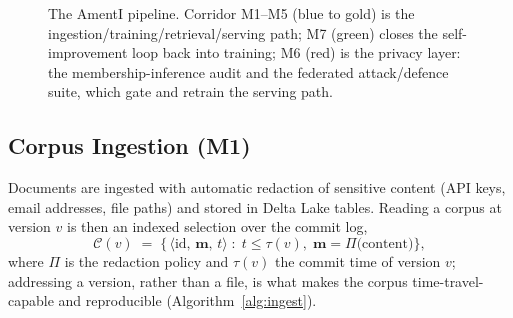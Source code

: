 \documentclass[11pt,a4paper]{article}
\theoremstyle{plain}
\theoremstyle{definition}
\begin{document}
\begin{figure}[h]
\centering
{}
\caption{The AmentI pipeline. Corridor M1--M5 (blue to gold) is the
ingestion/training/retrieval/serving path; M7 (green) closes the
self-improvement loop back into training; M6 (red) is the privacy layer:
the membership-inference audit and the federated attack/defence suite,
which gate and retrain the serving path.}
\label{fig:arch}
\end{figure}


\subsection{Corpus Ingestion (M1)}

Documents are ingested with automatic redaction of sensitive content
(API keys, email addresses, file paths) and stored in Delta Lake tables.
Reading a corpus at version $v$ is then an indexed selection over the
commit log,
\begin{equation}
\mathcal{C}(v)\;=\;\bigl\{\,\langle \mathrm{id},\,\mathbf{m},\,t\rangle
\;:\; t \le \tau(v),\;\mathbf{m}=\Pi\!\bigl(\mathrm{content}\bigr)\bigr\},
\label{eq:corpus-time-travel}
\end{equation}
where $\Pi$ is the redaction policy and $\tau(v)$ the commit time of
version $v$; addressing a version, rather than a file, is what makes the
corpus time-travel-capable and reproducible (Algorithm~\ref{alg:ingest}).
\end{document}
